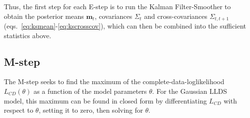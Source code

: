 \documentclass[10pt]{article}
\newcommand{\vm}{\mathbf{m}}
\begin{document}
Thus, the first step for each E-step is to run the Kalman
Filter-Smoother to obtain the posterior means $\vm_t$, covariances
$\Sigma_t$ and cross-covariances $\Sigma_{t,t+1}$
(eqs.~\ref{eq:ksmean}-\ref{eq:kscrosscov}), which can then be combined
into the sufficient statistics above.

\subsection{M-step}

The M-step seeks to find the maximum of the
complete-data-loglikelihood $L_{CD}(\theta)$ as a function of the
model parameters $\theta$.  For the Gaussian LLDS model, this maximum
can be found in closed form by differentiating $L_{CD}$ with respect
to $\theta$, setting it to zero, then solving for $\theta$.
\end{document}
